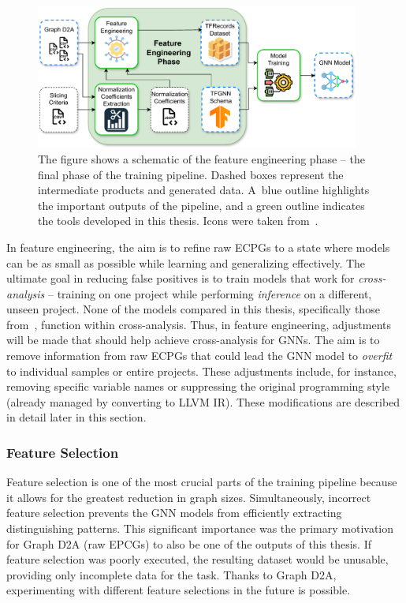 \begin{figure}[t]
	\centering
	\includegraphics[width=0.95\textwidth]{figures/feature-engineering-phase.pdf}
	\caption{The figure shows a schematic of the feature engineering phase -- the final phase of the training pipeline. Dashed boxes represent the intermediate products and generated data. A~blue outline highlights the important outputs of the pipeline, and a green outline indicates the tools developed in this thesis. Icons were taken from~\cite{icon-feature, icon-tfrecords, icon-model-training, icon-model}.}
	\label{figure:feature-enginering}
\end{figure}

In feature engineering, the aim is to refine raw ECPGs to a state where models can be as small as possible while learning and generalizing effectively. The ultimate goal in reducing false positives is to train models that work for \textit{cross-analysis} -- training on one project while performing \textit{inference} on a different, unseen project. None of the models compared in this thesis, specifically those from~\cite{D2A-zheng2021d2a, pujar2024analyzing}, function within cross-analysis. Thus, in feature engineering, adjustments will be made that should help achieve cross-analysis for GNNs. The aim is to remove information from raw ECPGs that could lead the GNN model to \textit{overfit} to individual samples or entire projects. These adjustments include, for instance, removing specific variable names or suppressing the original programming style (already managed by converting to LLVM IR). These modifications are described in detail later in this section.


\subsubsection{Feature Selection}
Feature selection is one of the most crucial parts of the training pipeline because it allows for the greatest reduction in graph sizes. Simultaneously, incorrect feature selection prevents the GNN models from efficiently extracting distinguishing patterns. This significant importance was the primary motivation for Graph D2A (raw EPCGs) to also be one of the outputs of this thesis. If feature selection was poorly executed, the resulting dataset would be unusable, providing only incomplete data for the task. Thanks to Graph D2A, experimenting with different feature selections in the future is possible.

